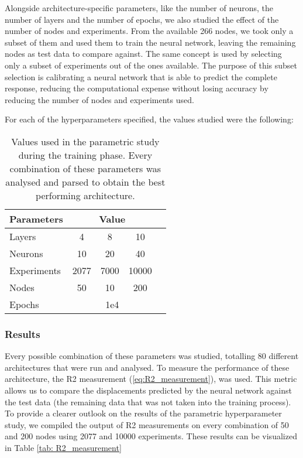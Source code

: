 Alongside architecture-specific parameters, like the number of neurons, the number of layers and the number of epochs, we also studied the effect of the number of nodes and experiments. From the available 266 nodes, we took only a subset of them and used them to train the neural network, leaving the remaining nodes as test data to compare against. The same concept is used by selecting only a subset of experiments out of the ones available. The purpose of this subset selection is calibrating a neural network that is able to predict the complete response, reducing the computational expense without losing accuracy by reducing the number of nodes and experiments used. 

For each of the hyperparameters specified, the values studied were the following:

\begin{table}[!hb]
  \centering
\begin{tabular}{l|cccc}
\textbf{Parameters} & \multicolumn{3}{c}{\textbf{Value}} \\ \hline
Layers              & 4      & 8       & 10            \\
Neurons             & 10     & 20      & 40           \\
Experiments         & 2077    & 7000    & 10000      \\
Nodes               & 50     & 10      & 200           \\
Epochs              &  \multicolumn{3}{c}{1e4}        
\end{tabular}
  \caption{Values used in the parametric study during the training phase. Every combination of these parameters was analysed and parsed to obtain the best performing architecture.}
\end{table}

\subsubsection{Results}


Every possible combination of these parameters was studied, totalling 80 different architectures that were run and analysed. To measure the performance of these architecture, the R2 measurement (\ref{eq:R2_measurement}), was used. This metric allows us to compare the displacements predicted by the neural network against the test data (the remaining data that was not taken into the training process). To provide a clearer outlook on the results of the parametric hyperparameter study, we compiled the output of R2 measurements on every combination of 50 and 200 nodes using 2077 and 10000 experiments. These results can be visualized in Table \ref{tab: R2_measurement}


